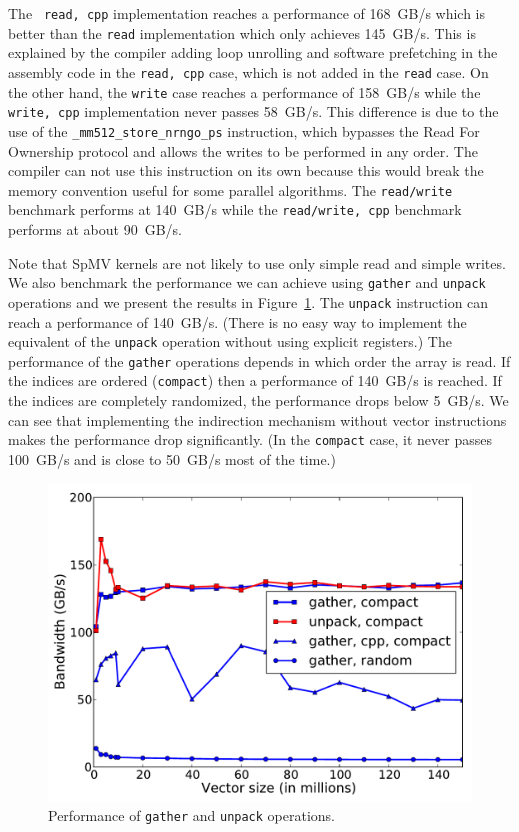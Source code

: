 \documentclass[10pt,conference,compsocconf]{IEEEtran}
\begin{document}
The {\tt
  read, cpp} implementation reaches a performance of 168~GB/s
 which is better than the {\tt read}
implementation which only achieves 145~GB/s. This
is explained by the compiler adding loop unrolling and software
prefetching in the assembly code in the {\tt read, cpp} case, which is
not added in the {\tt read} case. On the other hand, the {\tt write}
case reaches a performance of 158~GB/s while the
{\tt write, cpp} implementation never passes 58~GB/s. 
This difference is due to the use of the {\tt \_mm512\_store\_nrngo\_ps} instruction, 
which bypasses the Read For Ownership protocol and allows the writes
to be performed in any order. The compiler can not use this
instruction on its own because this would break the memory convention
useful for some parallel algorithms. The {\tt read/write} benchmark
performs at 140~GB/s while the {\tt read/write, cpp} benchmark performs
at about 90~GB/s.

Note that SpMV kernels are not likely to use only simple read and simple
writes. We also benchmark the performance we
can achieve using {\tt gather} and {\tt unpack} operations and we
present the results in Figure~\ref{fig:band_gather}. The {\tt unpack}
instruction can reach a performance of 140~GB/s. (There is no easy way
to implement the equivalent of the {\tt unpack} operation without
using explicit registers.) The performance of the {\tt gather}
operations depends in which order the array is read. If the indices
are ordered ({\tt compact}) then a performance of 140~GB/s is
reached. If the indices are completely randomized, the performance
drops below 5~GB/s. We can see that implementing the
indirection mechanism without vector instructions makes the
performance drop significantly. (In the {\tt compact} case, it never
passes 100~GB/s and is close to 50~GB/s most of the time.)

\begin{figure}
  \centering
  \includegraphics[width=.9\linewidth]{figures/bandwidth_gather_unpack.pdf}
  \caption{Performance of {\tt gather} and {\tt unpack} operations.}
  \label{fig:band_gather} 
\end{figure}
%
\end{document}
